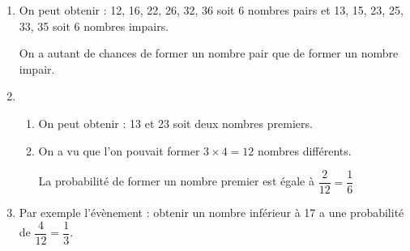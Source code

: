 	\begin{enumerate}
		\item %
		On peut obtenir : 12, 16, 22, 26, 32, 36 soit 6 nombres pairs et 13, 15, 23, 25, 33, 35 soit 6 nombres impairs.
		
On a autant de chances de former un nombre pair que de former un nombre impair.
		\item \begin{enumerate}
			\item %
			On peut obtenir : 13 et 23 soit deux nombres premiers.
			\item %
On a vu que l'on pouvait former $3 \times 4 = 12$ nombres différents.

La probabilité de former un nombre premier est égale à $ \dfrac{2}{12} = \dfrac{1}{6}$
		\end{enumerate}
		\item %
Par exemple l'évènement : \og obtenir un nombre inférieur à 17 \fg{} a une probabilité de $\dfrac{4}{12} = \dfrac{1}{3}$.
	\end{enumerate}

\vspace{5 mm}

